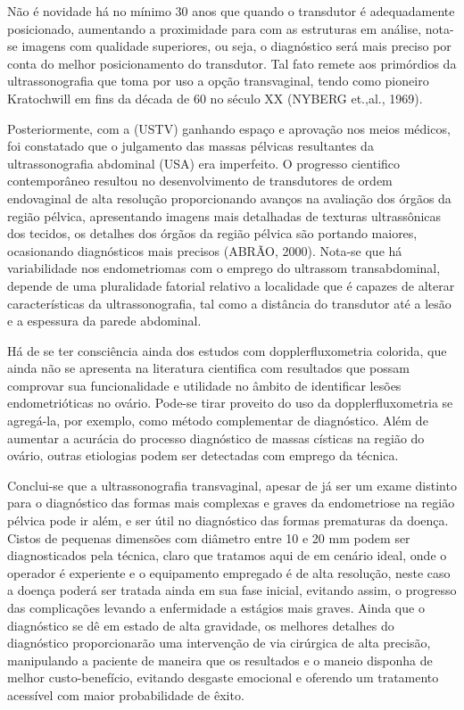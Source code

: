 \documentclass[12pt]{article} %
\begin{document}
Não é novidade há no mínimo 30 anos que quando o transdutor é adequadamente posicionado, aumentando a proximidade para com as estruturas em análise, nota-se imagens com qualidade superiores, ou seja, o diagnóstico será mais preciso por conta do melhor posicionamento do transdutor. Tal fato remete aos primórdios da ultrassonografia que toma por uso a opção transvaginal, tendo como pioneiro Kratochwill em fins da década de 60 no século XX (NYBERG et.,al., 1969). 

Posteriormente, com a (USTV) ganhando espaço e aprovação nos meios médicos, foi constatado que o julgamento das massas pélvicas resultantes da ultrassonografia abdominal (USA) era imperfeito. O progresso cientifico contemporâneo resultou no desenvolvimento de transdutores de ordem endovaginal de alta resolução proporcionando avanços na avaliação dos órgãos da região pélvica, apresentando imagens mais detalhadas de texturas ultrassônicas dos tecidos, os detalhes dos órgãos da região pélvica são portando maiores, ocasionando diagnósticos mais precisos (ABRÃO, 2000). Nota-se que há variabilidade nos endometriomas com o emprego do ultrassom transabdominal, depende de uma pluralidade fatorial relativo a localidade que é capazes de alterar características da ultrassonografia, tal como a distância do transdutor até a lesão e a espessura da parede abdominal. 

Há de se ter consciência ainda dos estudos com dopplerfluxometria colorida, que ainda não se apresenta na literatura cientifica com resultados que possam comprovar sua
funcionalidade e utilidade no âmbito de identificar lesões endometrióticas no ovário. Pode-se tirar proveito do uso da dopplerfluxometria se agregá-la, por exemplo, como método complementar de diagnóstico. Além de aumentar a acurácia do processo diagnóstico de massas císticas na região do ovário, outras etiologias podem ser detectadas com emprego da técnica. 


Conclui-se que a ultrassonografia transvaginal, apesar de já ser um exame distinto para o diagnóstico das formas mais complexas e graves da endometriose na região pélvica pode ir além, e ser útil no diagnóstico das formas prematuras da doença. Cistos de pequenas dimensões com diâmetro entre 10 e 20 mm podem ser diagnosticados pela técnica, claro que tratamos aqui de em cenário ideal, onde o operador é experiente e o equipamento empregado é de alta resolução, neste caso a doença poderá ser tratada ainda em sua fase inicial, evitando assim, o progresso das complicações levando a enfermidade a estágios mais graves.  Ainda que o diagnóstico se dê em estado de alta gravidade, os melhores detalhes do diagnóstico proporcionarão uma intervenção de via cirúrgica de alta precisão, manipulando a paciente de maneira que os resultados e o maneio disponha de melhor custo-benefício, evitando desgaste emocional e oferendo um tratamento acessível com maior probabilidade de êxito.     
\end{document}
